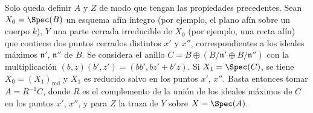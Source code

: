 \begin{remark}[20.2.16]
Solo queda definir $A$ y $Z$ de modo que tengan las propiedades precedentes.
Sean $X_0=\Spec(B)$ un esquema afín íntegro (por ejemplo, el plano afín sobre un cuerpo $k$), $Y$ una parte cerrada irreducible de $X_0$ (por ejemplo, una recta afín) que contiene dos puntos cerrados distintos $x'$ y $x''$, correspondientes a los ideales máximos $\mathfrak{n}'$, $\mathfrak{n}''$ de $B$.
Se considera el anillo $C=B\oplus(B/\mathfrak{n}'\oplus B/\mathfrak{n}'')$ con la multiplicación $(b,z)(b',z')=(bb',bz'+b'z)$.
Si $X_1=\Spec(C)$, se tiene $X_0=(X_1)_\mathrm{red}$ y $X_1$ es reducido salvo en los puntos $x'$, $x''$.
Basta entonces tomar $A=R^{-1}C$, donde $R$ es el complemento de la unión de los ideales máximos de $C$ en los puntos $x'$, $x''$, y para $Z$ la traza de $Y$ sobre $X=\Spec(A)$.
\end{remark}
